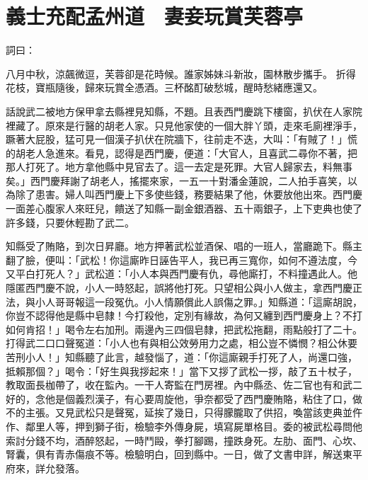 %

\chapter{義士充配孟州道　妻妾玩賞芙蓉亭}

\begin{showcontents}{}


詞曰：

八月中秋，涼飆微逗，芙蓉卻是花時候。誰家姊妹斗新妝，園林散步攜手。
折得花枝，寶瓶隨後，歸來玩賞全憑酒。三杯酩酊破愁城，醒時愁緒應還又。

話說武二被地方保甲拿去縣裡見知縣，不題。且表西門慶跳下樓窗，扒伏在人家院裡藏了。原來是行醫的胡老人家。只見他家使的一個大胖丫頭，走來毛廁裡淨手，蹶著大屁股，猛可見一個漢子扒伏在院牆下，往前走不迭，大叫：「有賊了！」慌的胡老人急進來。看見，認得是西門慶，便道：「大官人，且喜武二尋你不著，把那人打死了。地方拿他縣中見官去了。這一去定是死罪。大官人歸家去，料無事矣。」西門慶拜謝了胡老人，搖擺來家，一五一十對潘金蓮說，二人拍手喜笑，以為除了患害。婦人叫西門慶上下多使些錢，務要結果了他，休要放他出來。西門慶一面差心腹家人來旺兒，饋送了知縣一副金銀酒器、五十兩銀子，上下吏典也使了許多錢，只要休輕勘了武二。

知縣受了賄賂，到次日昇廳。地方押著武松並酒保、唱的一班人，當廳跪下。縣主翻了臉，便叫：「武松！你這廝昨日誣告平人，我已再三寬你，如何不遵法度，今又平白打死人？」武松道：「小人本與西門慶有仇，尋他廝打，不料撞遇此人。他隱匿西門慶不說，小人一時怒起，誤將他打死。只望相公與小人做主，拿西門慶正法，與小人哥哥報這一段冤仇。小人情願償此人誤傷之罪。」知縣道：「這廝胡說，你豈不認得他是縣中皂隸！今打殺他，定別有緣故，為何又纏到西門慶身上？不打如何肯招！」喝令左右加刑。兩邊內三四個皂隸，把武松拖翻，雨點般打了二十。打得武二口口聲冤道：「小人也有與相公效勞用力之處，相公豈不憐憫？相公休要苦刑小人！」知縣聽了此言，越發惱了，道：「你這廝親手打死了人，尚還口強，抵賴那個？」喝令：「好生與我拶起來！」當下又拶了武松一拶，敲了五十杖子，教取面長枷帶了，收在監內。一干人寄監在門房裡。內中縣丞、佐二官也有和武二好的，念他是個義烈漢子，有心要周旋他，爭奈都受了西門慶賄賂，粘住了口，做不的主張。又見武松只是聲冤，延挨了幾日，只得朦朧取了供招，喚當該吏典並仵作、鄰里人等，押到獅子街，檢驗李外傳身屍，填寫屍單格目。委的被武松尋問他索討分錢不均，酒醉怒起，一時鬥毆，拳打腳踢，撞跌身死。左肋、面門、心坎、腎囊，俱有青赤傷痕不等。檢驗明白，回到縣中。一日，做了文書申詳，解送東平府來，詳允發落。


\end{showcontents}

